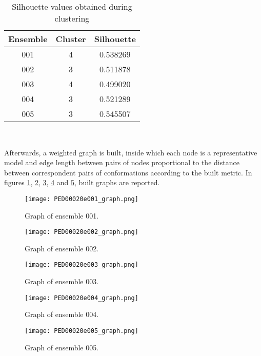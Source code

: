 \begin{table}[H]
\begin{center}
\begin{tabular}{ccc}
\textbf{Ensemble} & \textbf{Cluster} & \textbf{Silhouette}\\
\hline
001 & 4 & 0.538269\\
\hline
002 & 3 & 0.511878\\
\hline
003 & 4 & 0.499020\\
\hline
004 & 3 & 0.521289\\
\hline
005 & 3 & 0.545507\\
\end{tabular}
\end{center}
\caption{Silhouette values obtained during clustering}~\label{tab:silhouette}
\end{table}

Afterwards, a weighted graph is built, inside which each node is a representative model and edge length between pairs of nodes proportional to the distance between correspondent pairs of conformations according to the built metric. In figures \ref{model001}, \ref{model002}, \ref{model003}, \ref{model004} and \ref{model005}, built graphs are reported.

\begin{figure}[H]
    \centering
	\texttt{[image: PED00020e001\_graph.png]}
	\caption{Graph of ensemble 001.}
	\label{model001}
\end{figure}

\begin{figure}[H]
    \centering
		\texttt{[image: PED00020e002\_graph.png]}
		\caption{Graph of ensemble 002.}
		\label{model002}
\end{figure}

\begin{figure}[H]
    \centering
		\texttt{[image: PED00020e003\_graph.png]}
		\caption{Graph of ensemble 003.}
		\label{model003}
\end{figure}

\begin{figure}[H]
    \centering
		\texttt{[image: PED00020e004\_graph.png]}
		\caption{Graph of ensemble 004.}
		\label{model004}
\end{figure}

\begin{figure}[H]
    \centering
		\texttt{[image: PED00020e005\_graph.png]}
		\caption{Graph of ensemble 005.}
		\label{model005}
\end{figure}

